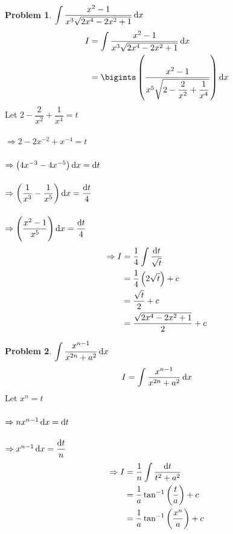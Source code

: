 \documentclass[14]{article}
\theoremstyle{definition}
\newtheorem{prob}{Problem}
\theoremstyle{case}
\begin{document}
\begin{prob}
$\displaystyle \int \dfrac{x^2 - 1}{x^3 \sqrt{2x^4 - 2x^2 + 1}} \dif x$
\begin{align*}
I &= \int \dfrac{x^2 - 1}{x^3 \sqrt{2x^4 - 2x^2 + 1}} \dif x\\
&= \bigints \left(\dfrac{x^2 - 1}{x^5 \sqrt{2 - \dfrac2{x^2} + \dfrac1{x^4}}}\right) \dif x
\end{align*}
Let $2 - \dfrac2{x^2} + \dfrac{1}{x^4} = t$\\\\
$\Rightarrow 2-2x^{-2} + x^{-4} = t$\\\\
$\Rightarrow \left(4x^{-3} - 4x^{-5}\right) \dif x = \dif t$\\\\
$\Rightarrow \left( \dfrac{1}{x^3} - \dfrac1{x^5}  \right) \dif x = \dfrac{\dif t}{4}$\\\\
$\Rightarrow \left( \dfrac{x^2 - 1}{x^5} \right)\dif x = \dfrac{\dif t}{4}$
\begin{align*}
\Rightarrow I &= \dfrac14 \int \dfrac{\dif t}{\sqrt{t}}\\
&= \dfrac14 \left(2\sqrt{t}\right) + c\\
&= \dfrac{\sqrt{t}}{2} + c\\
&= \dfrac{\sqrt{2x^4 - 2x^2 + 1}}{2} + c
\end{align*}
\end{prob}
\begin{prob}
$\displaystyle \int \dfrac{x^{n-1}}{x^{2n} + a^2} \dif x$
\[I = \int \dfrac{x^{n-1}}{x^{2n} + a^2} \dif x\]
Let $x^n = t$\\\\
$\Rightarrow nx^{n-1} \dif x = \dif t$\\\\
$\Rightarrow x^{n-1} \dif x = \dfrac{\dif t}{n}$
\begin{align*}
\Rightarrow I &= \dfrac1n \int \dfrac{\dif t}{t^2 + a^2}\\
&= \dfrac1a \tan^{-1}\left(\dfrac{t}a \right) + c\\
&= \dfrac1a \tan^{-1}\left(\dfrac{x^n}{a} \right) + c
\end{align*}
\end{prob}
\pagebreak
\end{document}
